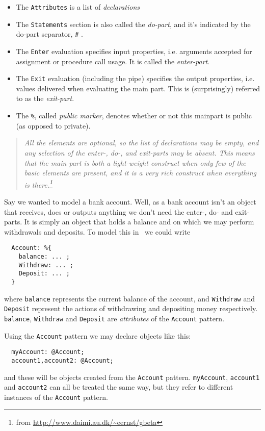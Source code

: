 \begin{itemize}\setlength{\itemsep}{-2pt}
\item The \texttt{Attributes} is a list of \emph{declarations}
\item The \texttt{Statements} section is also called the
  \emph{do-part}, and it's indicated by the do-part separator,
  \verb|#| .
\item The \texttt{Enter} evaluation specifies input properties,
  i.e. arguments accepted for assignment or procedure call usage. It
  is called the \emph{enter-part}.
\item The \texttt{Exit} evaluation (including the pipe) specifies the
  output properties, i.e. values delivered when evaluating the main
  part. This is (surprisingly) referred to as the \emph{exit-part}.
\item The \verb|%|, called \emph{public marker}, denotes whether or
  not this mainpart is public (as opposed to private).
\end{itemize}

\begin{quotation}\emph{
  All the elements are optional, so the list of declarations may be
  empty, and any selection of the enter-, do-, and exit-parts may be
  absent. This means that the main part is both a light-weight
  construct when only few of the basic elements are present, and it is
  a very rich construct when everything is there.\footnote{from
    \url{http://www.daimi.au.dk/~eernst/gbeta}}}
\end{quotation}

Say we wanted to model a bank account. Well, as a bank account isn't
an object that receives, does or outputs anything we don't need the
enter-, do- and exit-parts. It is simply an object that holds a
balance and on which we may perform withdrawals and deposits. To model
this in \gbeta\ we could write
\begin{verbatim}
  Account: %{
    balance: ... ;
    Withdraw: ... ;
    Deposit: ... ;
  }
\end{verbatim}
where \texttt{balance} represents the current balance of the account,
and \texttt{Withdraw} and \texttt{Deposit} represent the actions of
withdrawing and depositing money respectively. \texttt{balance},
\texttt{Withdraw} and \texttt{Deposit} are \emph{attributes} of the
\texttt{Account} pattern.

Using the \texttt{Account} pattern we may declare objects like this:
\begin{verbatim}
  myAccount: @Account;
  account1,account2: @Account;
\end{verbatim}
and these will be objects created from the \texttt{Account}
pattern. \texttt{myAccount}, \texttt{account1} and \texttt{account2}
can all be treated the same way, but they refer to different instances
of the \texttt{Account} pattern.

